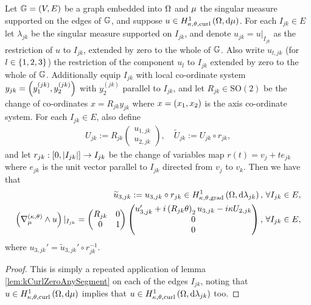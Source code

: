 \begin{theorem} \label{thm:ktTanCurlsGraphs}
	Let $\mathbb{G}=\left( V,E \right)$ be a graph embedded into $\Omega$ and $\mu$ the singular measure supported on the edges of $\mathbb{G}$, and suppose $u\in H^1_{\kappa,\theta,\mathrm{curl}}\left( \Omega, \mathrm{d}\mu \right)$.
	For each $I_{jk}\in E$ let $\lambda_{jk}$ be the singular measure supported on $I_{jk}$, and denote $u_{jk} = u\vert_{I_{jk}}$ as the restriction of $u$ to $I_{jk}$, extended by zero to the whole of $\mathbb{G}$.
	Also write $u_{l,jk}$ (for $l\in\left\{ 1,2,3 \right\}$) the restriction of the component $u_l$ to $I_{jk}$ extended by zero to the whole of $\mathbb{G}$.
	Additionally equip $I_{jk}$ with local co-ordinate system $y_{jk}=\left( y_1^{(jk)}, y_2^{(jk)} \right)$ with $y_2^{(jk)}$ parallel to $I_{jk}$, and let $R_{jk}\in\mathrm{SO}(2)$ be the change of co-ordinates $x=R_{jk}y_{jk}$ where $x=\left( x_1,x_2 \right)$ is the axis co-ordinate system.
	For each $I_{jk}\in E$, also define
	\begin{align*}
		U_{jk} := R_{jk}\begin{pmatrix} u_{1,jk} \\ u_{2,jk} \end{pmatrix}, \quad
		\widetilde{U}_{jk} := U_{jk} \circ r_{jk},
	\end{align*}
	and let $r_{jk}:\left[ 0,\left\lvert I_{jk} \right\rvert \right]\rightarrow I_{jk}$ be the change of variables map $r(t)=v_{j} + te_{jk}$ where $e_{jk}$ is the unit vector parallel to $I_{jk}$ directed from $v_j$ to $v_k$.
	Then we have that 
	\begin{align*}
		\widetilde{u}_{3,jk} := u_{3,jk}\circ r_{jk}\in H^1_{\kappa,\theta,\mathrm{grad}}\left( \Omega, \mathrm{d}\lambda_{jk} \right), &\ \forall I_{jk}\in E, \\
		\left( \nabla_{\mu}^{\left( \kappa, \theta \right)}\wedge u \right)\vert_{I_{jk}} = \begin{pmatrix} R_{jk} & 0 \\ 0 & 1 \end{pmatrix} \begin{pmatrix} u_{3,jk}' + i\left( R_{jk}\theta \right)_2 u_{3,jk} - i\kappa U_{2,jk} \\ 0 \\ 0 \end{pmatrix}, 
		&\ \forall I_{jk}\in E,
	\end{align*}
	where $u_{3,jk}' = \widetilde{u}_{3,jk}' \circ r_{jk}^{-1}$.
\end{theorem}
\begin{proof}
	This is simply a repeated application of lemma \ref{lem:kCurlZeroAnySegment} on each of the edges $I_{jk}$, noting that $u\in H^1_{\kappa,\theta,\mathrm{curl}}\left( \Omega, \mathrm{d}\mu \right)$ implies that $u\in H^1_{\kappa,\theta,\mathrm{curl}}\left( \Omega, \mathrm{d}\lambda_{jk} \right)$ too.
\end{proof}

